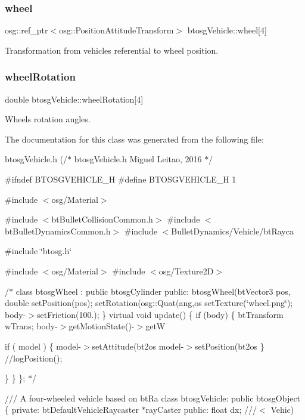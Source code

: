 \subsubsection{\texorpdfstring{wheel}{wheel}}
{\footnotesize\ttfamily osg\+::ref\+\_\+ptr$<$osg\+::\+Position\+Attitude\+Transform$>$ btosg\+Vehicle\+::wheel\mbox{[}4\mbox{]}}



Transformation from vehicle\textquotesingle{}s referential to wheel position. 

\mbox{\label{classbtosgVehicle_a0a9cd6f2c9b0defc44cd5e2e8d597418}} 
\subsubsection{\texorpdfstring{wheel\+Rotation}{wheelRotation}}
{\footnotesize\ttfamily double btosg\+Vehicle\+::wheel\+Rotation\mbox{[}4\mbox{]}}



Wheels\textquotesingle{} rotation angles. 



The documentation for this class was generated from the following file\+:\begin{DoxyCompactItemize}
\item 
btosg\+Vehicle.\+h (/$\ast$
	btosg\+Vehicle.\+h
	\+Miguel Leitao, 2016
$\ast$/

\#ifndef B\+T\+O\+S\+G\+V\+E\+H\+I\+C\+L\+E\+\_\+\+H
\#define B\+T\+O\+S\+G\+V\+E\+H\+I\+C\+L\+E\+\_\+\+H 1

\#include $<$osg/\+Material$>$

\#include $<$bt\+Bullet\+Collision\+Common.\+h$>$
\#include $<$bt\+Bullet\+Dynamics\+Common.\+h$>$
\#include $<$\+Bullet\+Dynamics/\+Vehicle/bt\+Rayca

\#include \char`\"{}btosg.\+h\char`\"{}

\#include $<$osg/\+Material$>$
\#include $<$osg/\+Texture2\+D$>$

/$\ast$
class btosg\+Wheel \+: public btosg\+Cylinder 
    public\+:
        btosg\+Wheel(bt\+Vector3 pos, double
            set\+Position(pos);
            set\+Rotation(osg\+::\+Quat(ang,os
            set\+Texture(\char`\"{}wheel.\+png\char`\"{});
            body-\/$>$set\+Friction(100.);
        \}
        virtual void update() \{
        if (body) \{
            bt\+Transform w\+Trans;
            body-\/$>$get\+Motion\+State()-\/$>$get\+W

            if ( model ) \{
                model-\/$>$set\+Attitude(bt2os
                model-\/$>$set\+Position(bt2os
            \}
            //log\+Position();

        \}
    \}
\};
$\ast$/

/// A four-\/wheeled vehicle based on bt\+Ra
class btosg\+Vehicle\+: public btosg\+Object \{
private\+:
    bt\+Default\+Vehicle\+Raycaster $\ast$ray\+Caster
public\+:
    float dx;			///$<$ Vehic)\end{DoxyCompactItemize}
